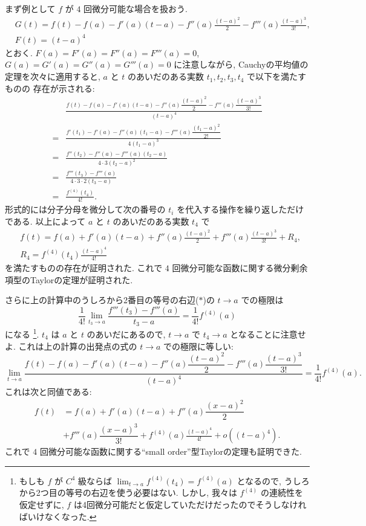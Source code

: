\documentclass[12pt,twoside]{jarticle}
\theoremstyle{jplain}
\theoremstyle{jplain}
\theoremstyle{jplain}
\numberwithin{theorem}{section}
\numberwithin{equation}{section}
\numberwithin{figure}{section}
\numberwithin{table}{section}
\begin{document}
まず例として $f$ が $4$ 回微分可能な場合を扱おう.
\begin{align*}
&
G(t)=f(t)-f(a)-f'(a)(t-a)-f''(a)\frac{(t-a)^2}{2}-f'''(a)\frac{(t-a)^3}{3!},
\\ &
F(t)=(t-a)^4
\end{align*}
とおく. $F(a)=F'(a)=F''(a)=F'''(a)=0$, $G(a)=G'(a)=G''(a)=G'''(a)=0$
に注意しながら, Cauchyの平均値の定理を次々に適用すると,
$a$ と $t$ のあいだのある実数 $t_1,t_2,t_3,t_4$ で以下を満たすものの
存在が示される:
\begin{align*}
&
\frac
{f(t)-f(a)-f'(a)(t-a)-f''(a)\dfrac{(t-a)^2}{2}-f'''(a)\dfrac{(t-a)^3}{3!}}
{(t-a)^4}
\\
=&\frac
{f'(t_1)-f'(a)-f''(a)(t_1-a)-f'''(a)\dfrac{(t_1-a)^2}{2!}}
{4(t_1-a)^3}
\\
=&\frac
{f''(t_2)-f''(a)-f'''(a)(t_2-a)}
{4\cdot 3(t_2-a)^2}
\\
=&\frac
{f'''(t_3)-f'''(a)}
{4\cdot 3\cdot 2(t_3-a)}
\tag{$*$}
\\
=&\frac
{f^{(4)}(t_4)}
{4!}.
\end{align*}
形式的には分子分母を微分して次の番号の $t_i$ を代入する操作を繰り返しただけである.
以上によって $a$ と $t$ のあいだのある実数 $t_4$ で
\begin{align*}
&
f(t)=f(a)+f'(a)(t-a)+f''(a)\frac{(t-a)^2}{2}+f'''(a)\frac{(t-a)^3}{3!}+R_4,
\\ &
R_4=f^{(4)}(t_4)\frac{(t-a)^4}{4!}
\end{align*}
を満たすものの存在が証明された.
これで $4$ 回微分可能な函数に関する微分剰余項型のTaylorの定理が証明された.

さらに上の計算中のうしろから2番目の等号の右辺($*$)の $t\to a$ での極限は
\[
\frac{1}{4!}\lim_{t_3\to a}\frac{f'''(t_3)-f'''(a)}{t_3-a}
=\frac{1}{4!}f^{(4)}(a)
\]
になる%
\footnote{もしも $f$ が $C^4$ 級ならば $\lim_{t\to a}f^{(4)}(t_4)=f^{(4)}(a)$
となるので, うしろから2つ目の等号の右辺を使う必要はない.
しかし, 我々は $f^{(4)}$ の連続性を仮定せずに,
$f$ は4回微分可能だと仮定していただけだったのでそうしなければいけなくなった.}.
$t_4$ は $a$ と $t$ のあいだにあるので, $t\to a$ で
$t_4\to a$ となることに注意せよ.
これは上の計算の出発点の式の $t\to a$ での極限に等しい:
\[
\lim_{t\to a}
\frac
{f(t)-f(a)-f'(a)(t-a)-f''(a)\dfrac{(t-a)^2}{2}-f'''(a)\dfrac{(t-a)^3}{3!}}
{(t-a)^4}
=
\frac{1}{4!}f^{(4)}(a).
\]
これは次と同値である:
\begin{align*}
f(t)
&=
f(a)+f'(a)(t-a)+f''(a)\dfrac{(x-a)^2}{2}
\\ &
+f'''(a)\dfrac{(x-a)^3}{3!}
+f^{(4)}(a)\frac{(t-a)^4}{4!}+o((t-a)^4).
\end{align*}
これで $4$ 回微分可能な函数に関する``small order''型Taylorの定理も証明できた.
\end{document}
